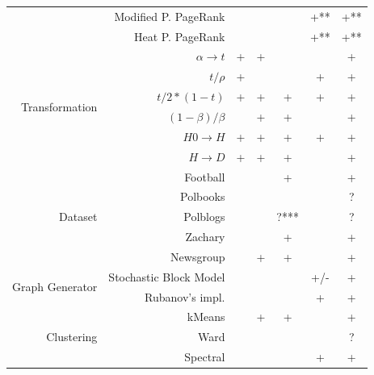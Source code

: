\documentclass{article}
\begin{document}
\begin{table}[H]
\begin{tabular}{rr|cccc|c}
                & Modified P. PageRank     &            &          &        & +**         & \cellcolor{yellow!25} +** \\
                & Heat P. PageRank         &            &          &        & +**         & \cellcolor{yellow!25} +** \\
                \hline
\multirow{6}{*}{Transformation} & $\alpha \rightarrow t$ & + & +   &        &             & +      \\
                & $t / \rho$               & +          &          &        & +           & +      \\
                & $t / 2*(1 - t)$          & +          & +        & +      & +           & +      \\
                & $(1 - \beta) / \beta$    &            & +        & +      &             & +      \\
                & $H0 \rightarrow H$       & +          & +        & +      & +           & +      \\
                & $H \rightarrow D$        & +          & +        & +      &             & +      \\
                \hline
\multirow{5}{*}{Dataset} & Football        &            &          & +      &             & +      \\
                & Polbooks                 &            &          &        &             & \cellcolor{yellow!25} ? \\
                & Polblogs                 &            &          & ?***   &             & \cellcolor{yellow!25} ? \\
                & Zachary                  &            &          & +      &             & +      \\
                & Newsgroup                &            & +        & +      &             & +      \\
                \hline
\multirow{2}{*}{Graph Generator} & Stochastic Block Model &  &     &        & \cellcolor{yellow!25} +/- & \cellcolor{yellow!25} + \\
                & Rubanov's impl.          &            &          &        & +           & +      \\
                \hline
\multirow{3}{*}{Clustering} & kMeans       &            & +        & +      &             & +      \\
                & Ward                     &            &          &        &             & \cellcolor{yellow!25} ? \\
                & Spectral                 &            &          &        & +           & +
\end{tabular}
\end{table}
\end{document}
